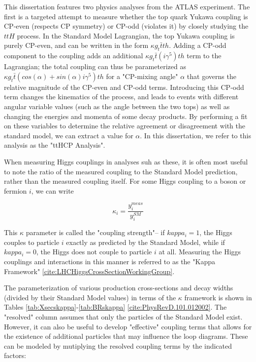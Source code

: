 This dissertation features two physics analyses from the ATLAS experiment. The first is a targeted attempt to measure whether the top quark Yukawa coupling is CP-even (respects CP symmetry) or CP-odd (violates it) by closely studying the $ttH$ process. In the Standard Model Lagrangian, the top Yukawa coupling is purely CP-even, and can be written in the form $\kappa g_{t} \bar{t}th$. Adding a CP-odd component to the coupling adds an additional $\kappa g_{t} \bar{t} (i \gamma^{5})th$ term to the Lagrangian; the total coupling can thus be parameterized as $\kappa g_{t} \bar{t} (cos(\alpha)+ sin(\alpha) i \gamma^{5} )th$ for a "CP-mixing angle" $\alpha$ that governs the relative magnitude of the CP-even and CP-odd terms. Introducing this CP-odd term changes the kinematics of the process, and leads to events with different angular variable values (such as the angle between the two tops) as well as changing the energies and momenta of some decay products. By performing a fit on these variables to determine the relative agreement or disagreement with the standard model, we can extract a value for $\alpha$. In this dissertation, we refer to this analysis as the "ttHCP Analysis".

When measuring Higgs couplings in analyses suh as these, it is often most useful to note the ratio of the measured coupling to the Standard Model prediction, rather than the measured coupling itself. For some Higgs coupling to a boson or fermion $i$, we can write

\begin{equation}
\kappa_{i} = \frac{y_{i}^{meas}}{y_{i}^{SM}}
\end{equation}

This $\kappa$ parameter is called the "coupling strength"-- if $kappa_{i} = 1$, the Higgs couples to particle $i$ exactly as predicted by the Standard Model, while if $kappa_{i} = 0$, the Higgs does not couple to particle $i$ at all. Measuring the Higgs couplings and interactions in this manner is referred to as the "Kappa Framework" \ref{cite:LHCHiggsCrossSectionWorkingGroup}.

The parameterization of various production cross-sections and decay widths (divided by their Standard Model values) in terms of the $\kappa$ framework is shown in Tables \ref{tab:Xsecskappa}-\ref{tab:BRskappa} \ref{cite:PhysRevD.101.012002}. The "resolved" column assumes that only the particles of the Standard Model exist. However, it can also be useful to develop "effective" coupling terms that allows for the existence of additional particles that may influence the loop diagrams. These can be modeled by mutiplying the resolved coupling terms by the indicated factors:

